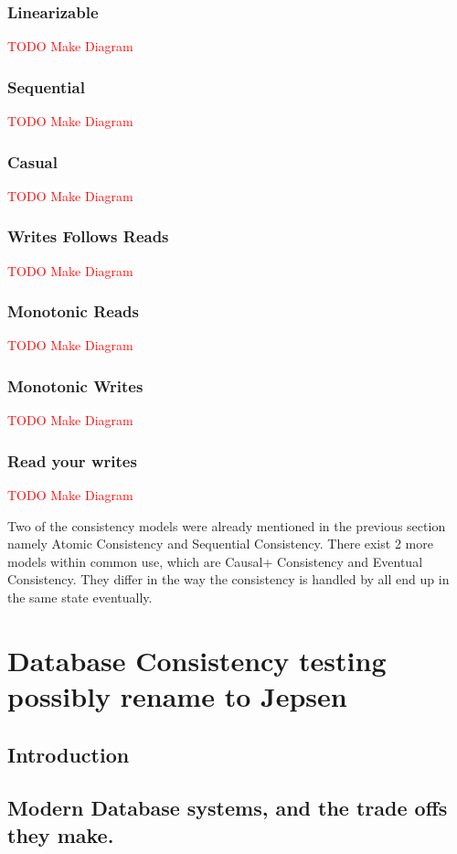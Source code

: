 \documentclass[a4paper,10pt,titlepage]{report}
\begin{document}
\subsection{Linearizable}
\textcolor{red}{TODO Make Diagram}
\subsection{Sequential}
\textcolor{red}{TODO Make Diagram}
\subsection{Casual}
\textcolor{red}{TODO Make Diagram}
\subsection{Writes Follows Reads}
\textcolor{red}{TODO Make Diagram}
\subsection{Monotonic Reads}
\textcolor{red}{TODO Make Diagram}
\subsection{Monotonic Writes}
\textcolor{red}{TODO Make Diagram}
\subsection{Read your writes}
\textcolor{red}{TODO Make Diagram}

Two of the consistency models were already mentioned in the previous section namely Atomic Consistency and Sequential Consistency. There exist 2 more models within common use, which are  Causal+ Consistency and  Eventual Consistency. They differ in the way the consistency is handled by all end up in the same state eventually.


\chapter{Database Consistency testing possibly rename to Jepsen}



\section{Introduction}


\section{Modern Database systems, and the trade offs they make.}
\end{document}
